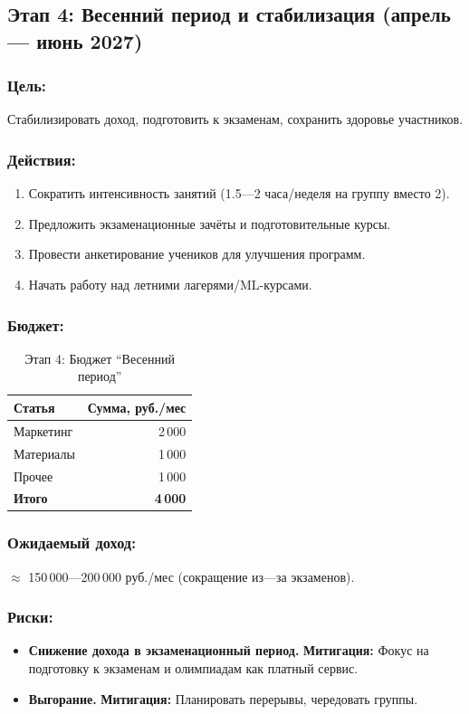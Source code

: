 \documentclass[12pt,a4paper]{article}
\begin{document}
\subsection{Этап 4: Весенний период и стабилизация (апрель --- июнь 2027)}

\subsubsection*{Цель:}
Стабилизировать доход, подготовить к экзаменам, сохранить здоровье участников.

\subsubsection*{Действия:}
\begin{enumerate}
  \item Сократить интенсивность занятий (1.5---2 часа/неделя на группу вместо 2).
  \item Предложить экзаменационные зачёты и подготовительные курсы.
  \item Провести анкетирование учеников для улучшения программ.
  \item Начать работу над летними лагерями/ML-курсами.
\end{enumerate}

\subsubsection*{Бюджет:}
\begin{table}[H]
\centering
\caption{Этап 4: Бюджет ``Весенний период''}
\begin{tabular}{lr}
\toprule
Статья & Сумма, руб./мес \\
\midrule
Маркетинг & 2\,000 \\
Материалы & 1\,000 \\
Прочее & 1\,000 \\
\midrule
\textbf{Итого} & \textbf{4\,000} \\
\bottomrule
\end{tabular}
\end{table}

\subsubsection*{Ожидаемый доход:} ${\approx}$ 150\,000---200\,000 руб./мес (сокращение из---за экзаменов).

\subsubsection*{Риски:}
\begin{itemize}
  \item \textbf{Снижение дохода в экзаменационный период.} \textbf{Митигация:} Фокус на подготовку к экзаменам и олимпиадам как платный сервис.
  \item \textbf{Выгорание.} \textbf{Митигация:} Планировать перерывы, чередовать группы.
\end{itemize}
\end{document}
